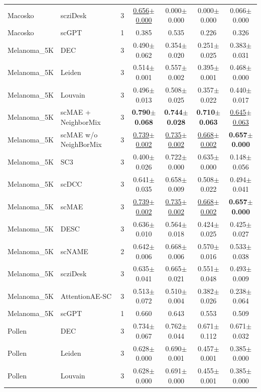 \begin{table}[t]
\begin{tabular}{llrcccc}
Macosko & scziDesk & 3 & \underline{0.656$\pm$0.000} & 0.000$\pm$0.000 & 0.000$\pm$0.000 & 0.066$\pm$0.000 \\
Macosko & scGPT & 1 & 0.385 & 0.535 & 0.226 & 0.326 \\
\midrule
Melanoma\_5K & DEC & 3 & 0.490$\pm$0.062 & 0.354$\pm$0.020 & 0.251$\pm$0.025 & 0.383$\pm$0.031 \\
Melanoma\_5K & Leiden & 3 & 0.514$\pm$0.001 & 0.557$\pm$0.002 & 0.395$\pm$0.001 & 0.468$\pm$0.000 \\
Melanoma\_5K & Louvain & 3 & 0.496$\pm$0.013 & 0.508$\pm$0.025 & 0.357$\pm$0.022 & 0.440$\pm$0.017 \\
Melanoma\_5K & scMAE + NeighborMix & 3 & \textbf{0.790$\pm$0.068} & \textbf{0.744$\pm$0.028} & \textbf{0.710$\pm$0.063} & \underline{0.645$\pm$0.063} \\
Melanoma\_5K & scMAE w/o NeighBorMix & 3 & \underline{0.739$\pm$0.002} & \underline{0.735$\pm$0.002} & \underline{0.668$\pm$0.002} & \textbf{0.657$\pm$0.000} \\
Melanoma\_5K & SC3 & 3 & 0.400$\pm$0.026 & 0.722$\pm$0.000 & 0.635$\pm$0.000 & 0.148$\pm$0.056 \\
Melanoma\_5K & scDCC & 3 & 0.641$\pm$0.035 & 0.658$\pm$0.009 & 0.508$\pm$0.022 & 0.494$\pm$0.041 \\
Melanoma\_5K & scMAE & 3 & \underline{0.739$\pm$0.002} & \underline{0.735$\pm$0.002} & \underline{0.668$\pm$0.002} & \textbf{0.657$\pm$0.000} \\
Melanoma\_5K & DESC & 3 & 0.636$\pm$0.010 & 0.564$\pm$0.018 & 0.424$\pm$0.025 & 0.425$\pm$0.027 \\
Melanoma\_5K & scNAME & 2 & 0.642$\pm$0.006 & 0.668$\pm$0.006 & 0.570$\pm$0.016 & 0.533$\pm$0.038 \\
Melanoma\_5K & scziDesk & 3 & 0.635$\pm$0.041 & 0.665$\pm$0.021 & 0.551$\pm$0.048 & 0.493$\pm$0.009 \\
Melanoma\_5K & AttentionAE-SC & 3 & 0.513$\pm$0.072 & 0.510$\pm$0.004 & 0.382$\pm$0.026 & 0.238$\pm$0.064 \\
Melanoma\_5K & scGPT & 1 & 0.660 & 0.643 & 0.553 & 0.509 \\
\midrule
Pollen & DEC & 3 & 0.734$\pm$0.067 & 0.762$\pm$0.044 & 0.671$\pm$0.112 & 0.671$\pm$0.032 \\
Pollen & Leiden & 3 & 0.628$\pm$0.000 & 0.690$\pm$0.001 & 0.457$\pm$0.001 & 0.385$\pm$0.000 \\
Pollen & Louvain & 3 & 0.628$\pm$0.000 & 0.691$\pm$0.000 & 0.455$\pm$0.001 & 0.385$\pm$0.000 \\

\end{tabular}
\end{table}
